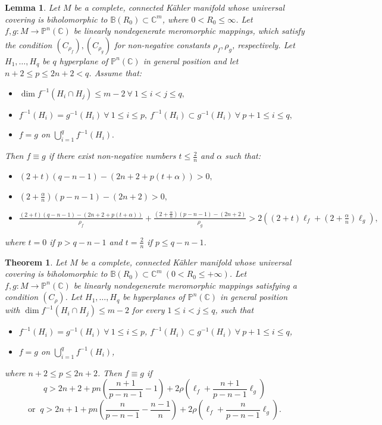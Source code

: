 \documentclass[10pt,a4paper]{amsart}
\newtheorem{theorem}{Theorem}
\newtheorem{lemma}{Lemma}
\newcommand{\B}{\mathbb{B}}
\newcommand{\C}{{\mathbb{C}}}
\renewcommand{\P}{{\mathbb{P}}}
\begin{document}
\begin{lemma}\label{3.4}
Let $M$ be a complete, connected K\"{a}hler manifold whose universal covering is biholomorphic to $\B(R_0) \subset \C^m$, where $0<R_{0} \leq \infty$. Let $f, g: M \rightarrow\P^n(\C)$ be linearly nondegenerate meromorphic mappings, which satisfy the condition $(C_{\rho_f}), (C_{\rho_g})$ for non-negative constants $\rho_f,\rho_g$, respectively. Let $H_1,\ldots,H_q$ be $q$ hyperplane of $\P^n(\C)$ in general position and let $n+2\le p\le 2n+2<q$. Assume that:
\begin{itemize}
\item[(a)] $\dim f^{-1}(H_i\cap H_j)\le m-2 \ \forall\ 1\leq i< j\leq  q,$
\item[(b)] $f^{-1}(H_i)=g^{-1}(H_i)\ \forall\ 1\le i\le p,\ f^{-1}(H_i)\subset g^{-1}(H_i)\ \forall\ p+1\le i\le q,$
\item[(c)] $f=g$ on $\bigcup_{i=1}^qf^{-1}(H_i).$
\end{itemize}
Then $f\equiv g$ if there exist non-negative numbers $t\le\frac{2}{n}$ and $\alpha$ such that:
\begin{itemize}
\item[(1)] $(2+t)(q-n-1)-(2n+2+p(t+\alpha))> 0,$
\item[(2)] $\left(2+\frac{\alpha}{n}\right)(p-n-1)-(2n+2)> 0,$
\item[(3)] $\frac{(2+t)(q-n-1)-(2n+2+p(t+\alpha))}{\rho_f}+\frac{\left(2+\frac{\alpha}{n}\right)(p-n-1)-(2n+2)}{\rho_g}> 2\left((2+t)\ell_f+(2+\frac{\alpha}{n})\ell_g\right),$
\end{itemize}
where $t=0$ if $p> q-n-1$ and $t=\frac{2}{n}$ if $p\le q-n-1$.
\end{lemma}

\begin{theorem}\label{1.1}
Let $M$ be a complete, connected K\"{a}hler manifold whose universal covering is biholomorphic to $\B(R_0) \subset \C^m\ (0<R_0\le +\infty)$. Let $f, g: M \rightarrow\P^n(\C)$ be linearly nondegenerate meromorphic mappings satisfying a condition $(C_{\rho})$. Let $H_1,\ldots,H_q$ be hyperplanes of $\P^n(\C)$ in general position with $\dim f^{-1}(H_i\cap H_j)\le m-2$ for every $1\le i<j\le q$, such that
\begin{itemize}
\item[(i)] $f^{-1}(H_i)=g^{-1}(H_i)\ \forall\ 1\le i\le p$, $f^{-1}(H_i)\subset g^{-1}(H_i)\ \forall\ p+1\le i\le q$, 
\item[(ii)] $f=g$ on $\bigcup_{i=1}^qf^{-1}(H_i)$, 
\end{itemize}
where $n+2\le p\le 2n+2$. Then $f\equiv g$ if 
$$q>2n+2+pn\left(\frac{n+1}{p-n-1}-1\right)+2\rho\left(\ell_f+\frac{n+1}{p-n-1}\ell_g\right)$$
$$\text{or }\ q>2n+1+pn\left(\frac{n}{p-n-1}-\frac{n-1}{n}\right)+2\rho\left(\ell_f+\frac{n}{p-n-1}\ell_g\right).$$
\end{theorem}
\end{document}
